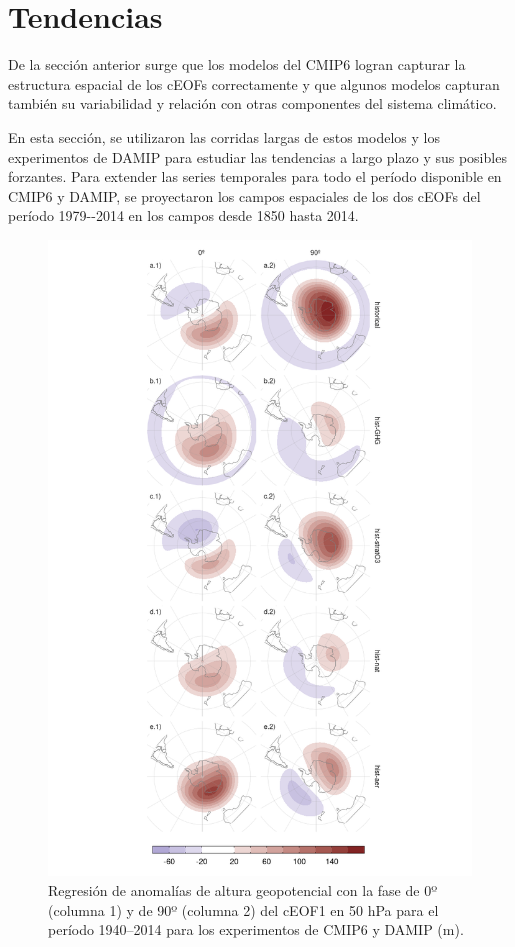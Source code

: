 \documentclass[12pt,oneside,a4paper]{reedthesis}
\begin{document}
\hypertarget{tendencias}{%
\section{Tendencias}\label{tendencias}}

De la sección anterior surge que los modelos del CMIP6 logran capturar la estructura espacial de los cEOFs correctamente y que algunos modelos capturan también su variabilidad y relación con otras componentes del sistema climático.

En esta sección, se utilizaron las corridas largas de estos modelos y los experimentos de DAMIP para estudiar las tendencias a largo plazo y sus posibles forzantes.
Para extender las series temporales para todo el período disponible en CMIP6 y DAMIP, se proyectaron los campos espaciales de los dos cEOFs del período 1979-\/-2014 en los campos desde 1850 hasta 2014.

\begin{figure}

{\centering \includegraphics{figures/50-cmip6/regresion-hgt-damip-1} 

}

\caption{Regresión de anomalías de altura geopotencial con la fase de 0º (columna 1) y de 90º (columna 2) del cEOF1 en 50 hPa para el período 1940--2014 para los experimentos de CMIP6 y DAMIP (m).}\label{fig:regresion-hgt-damip}
\end{figure}
\end{document}
